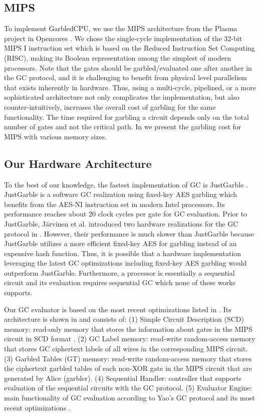\subsection{MIPS}
To implement GarbledCPU, we use the MIPS architecture from the Plasma project in Opencores \cite{rhoads2006plasma}. We chose the single-cycle implementation of the 32-bit MIPS I instruction set which is based on the Reduced Instruction Set Computing (RISC), making its Boolean representation among the simplest of modern processors. Note that the gates should be garbled/evaluated one after another in the GC protocol, and it is challenging to benefit from physical level parallelism that exists inherently in hardware. Thus, using a multi-cycle, pipelined, or a more sophisticated architecture not only complicates the implementation, but also counter-intuitively, increases the overall cost of garbling for the same functionality. The time required for garbling a circuit depends only on the total number of gates and not the critical path. In  we present the garbling cost for MIPS with various memory sizes.

\subsection{Our Hardware Architecture}\label{ssec:hwimp}
To the best of our knowledge, the fastest implementation of GC is JustGarble \cite{bellare2013efficient}. JustGarble is a software GC realization using fixed-key AES garbling which benefits from the AES-NI instruction set in modern Intel processors. Its performance reaches about $20$ clock cycles per gate for GC evaluation. Prior to JustGarble, J\"arvinen et al. introduced two hardware realizations for the GC protocol in \cite{jarvinen2010garbled}. However, their performance is much slower than JustGarble because JustGarble utilizes a more efficient fixed-key AES for garbling instead of an expensive hash function. Thus, it is possible that a hardware implementation leveraging the latest GC optimizations including fixed-key AES garbling would outperform JustGarble. Furthermore, a processor is essentially a sequential circuit and its evaluation requires sequential GC which none of these works supports.

Our GC evaluator is based on the most recent optimizations listed in . Its architecture is shown in  and consists of:
(1) Simple Circuit Description (SCD) memory: read-only memory that stores the information about gates in the MIPS circuit in SCD format \cite{bellare2013efficient, songhori2015tinygarble}.
(2) GC Label memory: read-write random-access memory that stores GC ciphertext labels of all wires in the corresponding MIPS circuit.
(3) Garbled Tables (GT) memory: read-write random-access memory that stores the ciphertext garbled tables of each non-XOR gate in the MIPS circuit that are generated by Alice (garbler).
(4) Sequential Handler: controller that supports evaluation of the sequential circuits with the GC protocol.
(5) Evaluator Engine: main functionality of GC evaluation according to Yao's GC protocol and its most recent optimizations \cite{kolesnikov2008improved, bellare2013efficient, zahur2015two,songhori2015tinygarble}.

